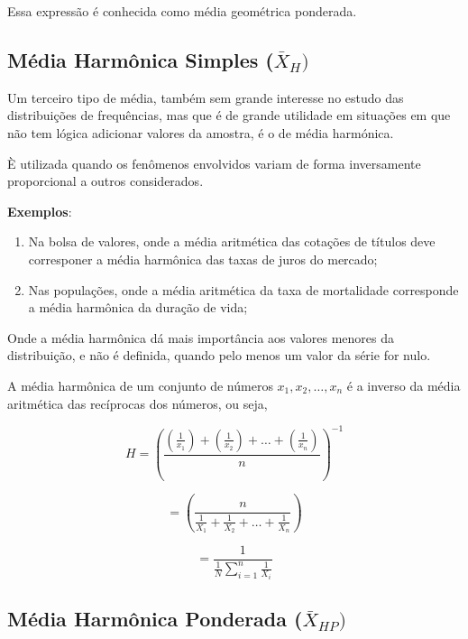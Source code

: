 Essa expressão é conhecida como média geométrica ponderada.



\subsection{Média Harmônica Simples ($\bar{X}_{H})$}


\inic Um terceiro tipo de média, também sem grande interesse no estudo das
distribuições de frequências, mas que é de grande utilidade em situações em que não
tem lógica adicionar valores da amostra, é o de média harmónica.\vskip0.3cm



È utilizada quando os fenômenos envolvidos variam de forma inversamente proporcional a outros considerados.\vskip0.3cm

\textbf{Exemplos}:
\begin{enumerate}
  \item Na bolsa de valores, onde a média aritmética das cotações de títulos deve corresponer a média harmônica das taxas de juros do mercado;
  \item Nas populações, onde a média aritmética da taxa de mortalidade corresponde a média harmônica da duração de vida;
\end{enumerate}

Onde a média harmônica dá mais importância aos valores menores da distribuição, e não é definida, quando pelo menos um valor da série for nulo.\vskip0.3cm


A média harmônica de um conjunto de números $x_{1},x_{2},\ldots,x_{n}$ é a inverso da média
aritmética das recíprocas dos números, ou seja,


\begin{equation}\label{harmonica1}
H=(\frac{(\frac{1}{x_{1}})+(\frac{1}{x_{2}})+\ldots+(\frac{1}{x_{n}})}{n})^{-1}
\end{equation}

\begin{equation*}\label{harmonica1}
 =(\frac{n}{\frac{1}{X_{1}}+\frac{1}{X_{2}}+\ldots+\frac{1}{X_{n}}})
\end{equation*}

\begin{equation*}\label{harmonica}
=\frac{1}{\frac{1}{N}\sum_{i=1}^{n}\frac{1}{X_{i}}}
\end{equation*}

\subsection{Média Harmônica Ponderada ($\bar{X}_{HP})$}


